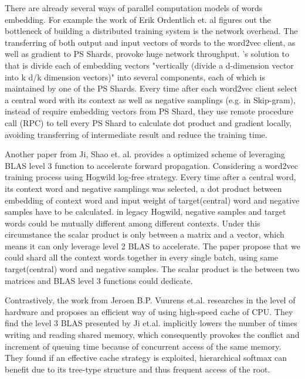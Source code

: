 \documentclass[11pt,a4paper]{article}
\begin{document}
There are already several ways of parallel computation models of words embedding. For example the work of Erik Ordentlich et. al \cite{ordentlich2016network} figures out the bottleneck of building a distributed training system is the network overhead. The transferring of both output and input vectors of words to the word2vec client, as well as gradient to PS Shards, provoke huge network throughput. \citep{ordentlich2016network}'s solution to that is divide each of embedding vectors "vertically (divide a d-dimension vector into k d/k dimension vectors)" into several components, each of which is maintained by one of the PS Shards. Every time after each word2vec client select a central word with its context as well as negative samplings (e.g. in Skip-gram), instead of require embedding vectors from PS Shard, they use remote procedure call (RPC) to tell every PS Shard to calculate dot product and gradient locally, avoiding transferring of intermediate result and reduce the training time.

Another paper from Ji, Shao et. al. \cite{ji2016parallelizing} provides a optimized scheme of leveraging BLAS level 3 function to accelerate forward propagation. Considering a word2vec training process using Hogwild \cite{recht2011hogwild} log-free strategy. Every time after a central word, its context word and negative samplings was selected, a dot product between embedding of context word and input weight of target(central) word and negative samples have to be calculated. in legacy Hogwild, negative samples and target words could be mutually different among different contexts. Under this circumstance the scalar product is only between a matrix and a vector, which means it can only leverage level 2 BLAS to accelerate. The paper propose that we could shard all the context words together in every single batch, using same target(central) word and negative samples. The scalar product is the between two matrices and BLAS level 3 functions could dedicate.

Contrastively, the work from Jeroen B.P. Vuurens et.al. \cite{eickhoff2016efficient} researches in the level of hardware and proposes an efficient way of using high-speed cache of CPU. They find the level 3 BLAS presented by Ji et.al. implicitly lowers the number of times writing and reading shared memory, which consequently provokes the conflict and increment of queuing time because of concurrent access of the same memory. They found if an effective cache strategy is exploited, hierarchical softmax can benefit due to its tree-type structure and  thus frequent access of the root.
\end{document}
